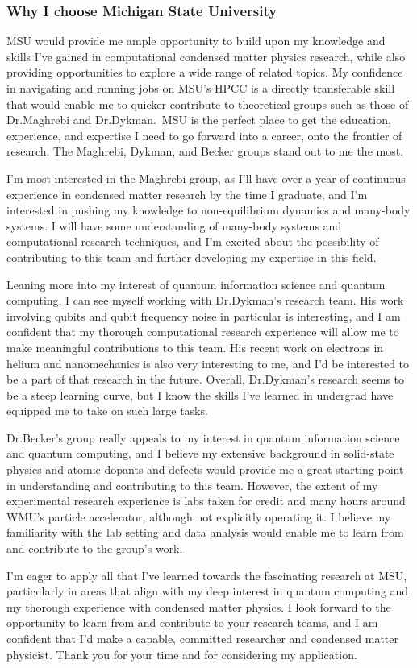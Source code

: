 \documentclass[11pt]{article}
\newcommand{\school}{Michigan State University}
\newcommand{\schoolabbr}{MSU}
\begin{document}
\subsubsection*{Why I choose \school{}}
\schoolabbr{} would provide me ample opportunity to build upon my knowledge and skills I've gained in computational condensed matter physics research, while also providing opportunities to explore a wide range of related topics. My confidence in navigating and running jobs on MSU's HPCC is a directly transferable skill that would enable me to quicker contribute to theoretical groups such as those of Dr.\@ Maghrebi and Dr.\@ Dykman.\ \schoolabbr{} is the perfect place to get the education, experience, and expertise I need to go forward into a career, onto the frontier of research. The Maghrebi, Dykman, and Becker groups stand out to me the most.

I'm most interested in the Maghrebi group, as I'll have over a year of continuous experience in condensed matter research by the time I graduate, and I'm interested in pushing my knowledge to non-equilibrium dynamics and many-body systems. I will have some understanding of many-body systems and computational research techniques, and I'm excited about the possibility of contributing to this team and further developing my expertise in this field.

Leaning more into my interest of quantum information science and quantum computing, I can see myself working with Dr.\@ Dykman's research team. His work involving qubits and qubit frequency noise in particular is interesting, and I am confident that my thorough computational research experience will allow me to make meaningful contributions to this team. His recent work on electrons in helium and nanomechanics is also very interesting to me, and I'd be interested to be a part of that research in the future. Overall, Dr.\@ Dykman's research seems to be a steep learning curve, but I know the skills I've learned in undergrad have equipped me to take on such large tasks.

Dr.\@ Becker's group really appeals to my interest in quantum information science and quantum computing, and I believe my extensive background in solid-state physics and atomic dopants and defects would provide me a great starting point in understanding and contributing to this team. However, the extent of my experimental research experience is labs taken for credit and many hours around WMU's particle accelerator, although not explicitly operating it. I believe my familiarity with the lab setting and data analysis would enable me to learn from and contribute to the group's work.

I'm eager to apply all that I've learned towards the fascinating research at \schoolabbr{}, particularly in areas that align with my deep interest in quantum computing and my thorough experience with condensed matter physics. I look forward to the opportunity to learn from and contribute to your research teams, and I am confident that I'd make a capable, committed researcher and condensed matter physicist. Thank you for your time and for considering my application.
\end{document}
